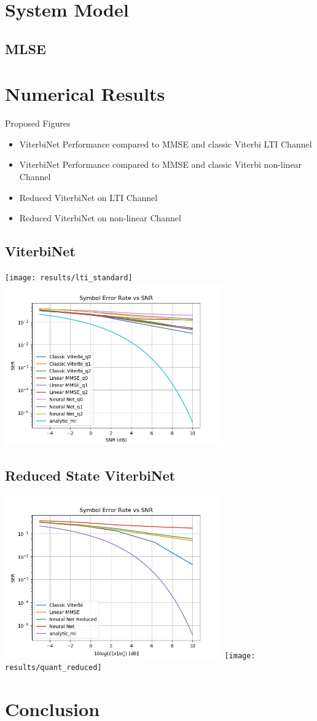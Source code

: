\documentclass[12pt,a4paper]{report}
\begin{document}
\section{System Model}

\subsection{MLSE}


\section{Numerical Results}
Proposed Figures
\begin{itemize}
\item ViterbiNet Performance compared to MMSE and classic Viterbi LTI Channel
\item ViterbiNet Performance compared to MMSE and classic Viterbi non-linear Channel
\item Reduced ViterbiNet on LTI Channel
\item Reduced ViterbiNet on non-linear Channel
\end{itemize}
\subsection*{ViterbiNet}
	\texttt{[image: results/lti\_standard]}
	\includegraphics[width=\textwidth,height = 7cm]{results/quant_standard}

\subsection*{Reduced State ViterbiNet}
	\includegraphics[width=\textwidth,height = 7cm]{results/lti_reduced}
	\texttt{[image: results/quant\_reduced]}
\section{Conclusion}

\newpage

\end{document}
